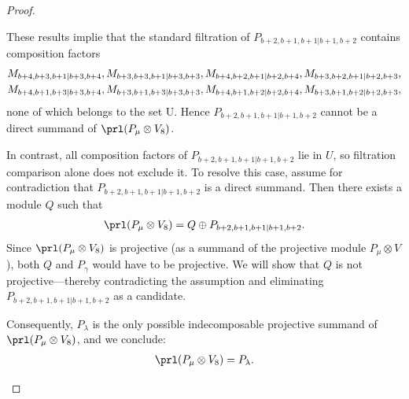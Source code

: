 \begin{proof}
\begin{enumerate}
\begin{enumerate}
These results implie that the standard filtration of $P_{b+2,b+1,b+1|b+1,b+2}$ contains composition factors
\begin{equation}\notag
  \begin{aligned}
M_{b+4,b+3,b+1|b+3,b+4},
M_{b+3,b+3,b+1|b+3,b+3},
M_{b+4,b+2,b+1|b+2,b+4},
M_{b+3,b+2,b+1|b+2,b+3},\\
M_{b+4,b+1,b+3|b+3,b+4},
M_{b+3,b+1,b+3|b+3,b+3},
M_{b+4,b+1,b+2|b+2,b+4},
M_{b+3,b+1,b+2|b+2,b+3}
,   
  \end{aligned}
\end{equation}
 none of which belongs to the set U. 
Hence $P_{b+2,b+1,b+1|b+1,b+2}$ cannot be a direct summand of $\prl(P_\mu \otimes V_8)$.


In contrast, all composition factors of $P_{b+2,b+1,b+1|b+1,b+2}$ lie in $U$, so filtration comparison alone does not exclude it. To resolve this case, assume for contradiction that $P_{b+2,b+1,b+1|b+1,b+2}$ is a direct summand. Then there exists a module $Q$ such that
\begin{equation}\notag
  \begin{aligned}
    \prl(P_\mu \otimes V_8) = Q \oplus P_{b+2,b+1,b+1|b+1,b+2}.
  \end{aligned}
\end{equation}
Since $\prl(P_\mu \otimes V_8)$ is projective (as a summand of the projective module $P_\mu \otimes V$), both $Q$ and $P_\gamma$ would have to be projective. We will show that $Q$ is not projective—thereby contradicting the assumption and eliminating $P_{b+2,b+1,b+1|b+1,b+2}$ as a candidate.

Consequently, $P_\lambda$ is the only possible indecomposable projective summand of $\prl(P_\mu \otimes V_8)$, and we conclude:
\begin{equation}\notag
  \begin{aligned}
\prl(P_\mu \otimes V_8) = P_\lambda.
  \end{aligned}
\end{equation}


\end{enumerate}
\end{enumerate}
\end{proof}
